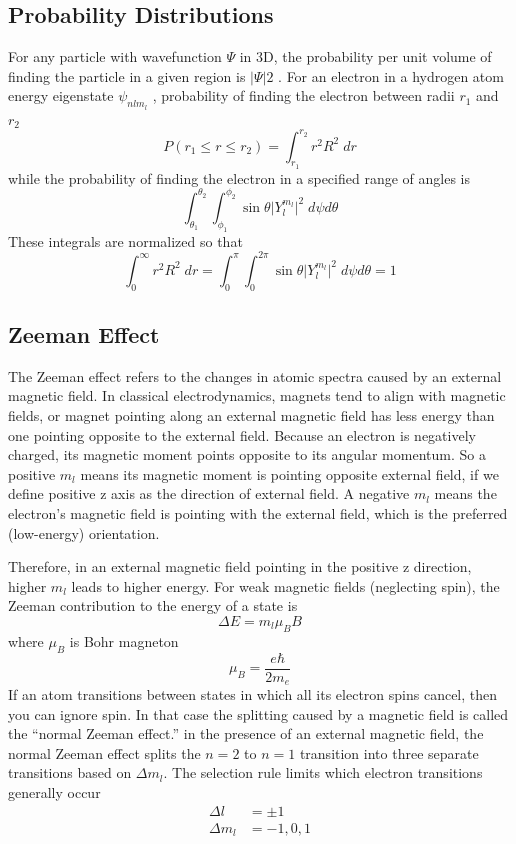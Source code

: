 \documentclass[../main.tex]{subfiles}
\begin{document}
\subsection*{Probability Distributions}
For any particle with wavefunction $\Psi$ in 3D, the probability per unit volume of finding the particle in a given region is $|\Psi|2$ . For an electron in a hydrogen atom energy eigenstate $\psi_{nlm_l}$ , probability of finding the electron between radii $r_1$ and $r_2$
\begin{equation*}
    P(r_1 \leq r \leq r_2)= \int_{r_1}^{r_2}r^2R^2\;dr
\end{equation*}
while the probability of finding the electron in a specified range of angles is
\begin{equation*}
    \int_{\theta_1}^{\theta_2}\int_{\phi_1}^{\phi_2} \sin\theta \big| Y_l^{m_l}\big|^2\;d\psi d\theta
\end{equation*}
These integrals are normalized so that
\begin{equation*}
    \int_{0}^{\infty}r^2R^2\;dr = \int_{0}^{\pi}\int_{0}^{2\pi} \sin\theta \big| Y_l^{m_l}\big|^2\;d\psi d\theta =1
\end{equation*}

\subsection*{Zeeman Effect} 
The Zeeman effect refers to the changes in atomic spectra caused by an external magnetic field. In classical electrodynamics, magnets tend to align with magnetic fields, or magnet pointing along an external magnetic field has less energy than one pointing opposite to the external field. Because an electron is negatively charged, its magnetic moment points opposite to its angular momentum. So a positive $m_l$ means its magnetic moment is pointing opposite external field, if we define positive z axis as the direction of external field. A negative $m_l$ means the electron's magnetic field is pointing with the external field, which is the preferred (low-energy) orientation.

Therefore, in an external magnetic field pointing in the positive z direction, higher $m_l$ leads to higher energy. For weak magnetic fields (neglecting spin), the Zeeman contribution to the energy of a state is
\begin{equation*}
    \Delta E=m_l\mu_BB
\end{equation*}
where $\mu_B$ is Bohr magneton
\begin{equation*}
    \mu_B=\frac{e\hbar}{2m_e}
\end{equation*}
If an atom transitions between states in which all its electron spins cancel, then you can ignore spin. In that case the splitting caused by a magnetic field is called the “normal Zeeman effect.” in the presence of an external magnetic field, the normal Zeeman effect splits the $n = 2$ to $n = 1$ transition into three separate transitions based on $\Delta m_l$. The selection rule limits which electron transitions generally occur
\begin{align*}
    \Delta l&=\pm 1\\
    \Delta m_l&=-1,0,1
\end{align*}
\end{document}
